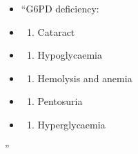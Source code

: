 \documentclass[
]{book}
\providecommand{\tightlist}{%
  \setlength{\itemsep}{0pt}\setlength{\parskip}{0pt}}
\begin{document}
\begin{itemize}
\item
  ``G6PD deficiency:
\item
  \begin{enumerate}
  \def\labelenumi{(\Alph{enumi})}
  \tightlist
  \item
    Cataract\\
  \end{enumerate}
\item
  \begin{enumerate}
  \def\labelenumi{(\Alph{enumi})}
  \setcounter{enumi}{1}
  \tightlist
  \item
    Hypoglycaemia\\
  \end{enumerate}
\item
  \begin{enumerate}
  \def\labelenumi{(\Alph{enumi})}
  \setcounter{enumi}{2}
  \tightlist
  \item
    Hemolysis and anemia\\
  \end{enumerate}
\item
  \begin{enumerate}
  \def\labelenumi{(\Alph{enumi})}
  \setcounter{enumi}{3}
  \tightlist
  \item
    Pentosuria\\
  \end{enumerate}
\item
  \begin{enumerate}
  \def\labelenumi{(\Alph{enumi})}
  \setcounter{enumi}{4}
  \tightlist
  \item
    Hyperglycaemia
  \end{enumerate}
\end{itemize}

''

  
\end{document}
